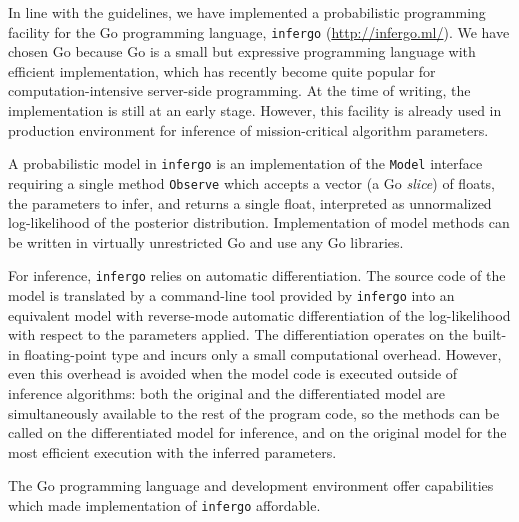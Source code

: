 \documentclass[sigplan,review]{acmart}\settopmatter{printfolios=true,printccs=false,printacmref=false}
\begin{document}
In line with the guidelines, we have implemented a probabilistic
programming facility for the Go programming language,
\texttt{infergo} (\url{http://infergo.ml/}). We have chosen Go
because Go is a small but expressive programming language with
efficient implementation, which has recently become quite
popular for computation-intensive server-side programming. At
the time of writing, the implementation is still at an early
stage. However, this facility is already used in production
environment for inference of mission-critical algorithm
parameters.  

A probabilistic model in \texttt{infergo} is an implementation
of the \texttt{Model} interface requiring a single method
\texttt{Observe} which accepts a vector (a Go \textit{slice}) of
floats, the parameters to infer, and returns a single float,
interpreted as unnormalized log-likelihood of the posterior
distribution. Implementation of model methods can be written
in virtually unrestricted Go and use any Go libraries.

For inference, \texttt{infergo} relies on automatic
differentiation. The source code of the model is
translated by a command-line tool provided by \texttt{infergo}
into an equivalent model with reverse-mode automatic
differentiation of the log-likelihood with respect 
to the parameters applied. The differentiation operates
on the built-in floating-point type and incurs only a small
computational overhead. However, even this overhead is avoided
when the model code is executed outside of inference algorithms:
both the original and the differentiated model are
simultaneously available to the rest of the program code, so
the methods can be called on the differentiated model for
inference, and on the original model for the most efficient
execution with the inferred parameters.

The Go programming language and development environment offer
capabilities which made implementation of \texttt{infergo}
affordable.
\end{document}
